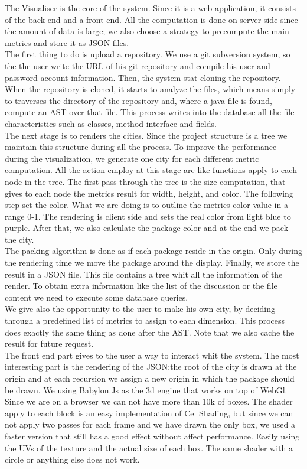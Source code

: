 \documentclass[]{usiinfbachelorproject}
\begin{document}
The Visualiser is the core of the system. Since it is a web application, it consists of the back-end and a front-end. All the computation is done on server side since the amount of data is large; we also choose a strategy to precompute the main metrics and store it as JSON files.\\
The first thing to do is upload a repository. We use a git subversion system, so the the user  write the URL of his git repository and compile his user and password account information. Then, the system stat cloning the repository. When the repository is cloned, it starts to analyze the files, which means simply to traverses the directory of the repository and, where a java file is found, compute an  AST over that file. This process writes into the database all the file characteristics such as classes, method interface and fields.\\
The next stage is to renders the cities. Since the project structure is a tree we maintain this structure during all the process. To improve the performance during the visualization, we generate one city for each different metric computation. All the action employ at this stage are like functions apply to each node in the tree. The first pass through the tree is the size computation, that gives to each node the metrics result for width, height, and color. The following step set the color. What we are doing is to outline the metrics color value in a range 0-1. The rendering is client side and sets the real color from light blue to purple. After that, we also calculate the package color and at the end we pack the city.\\
The packing algorithm is done as if each package reside in the origin. Only during the rendering time we move the package around the display. Finally, we store the result in a JSON file. This file contains a tree whit all the information of the render. To obtain extra information like the list of the discussion or the file content we need to execute some database queries.\\
We give also the opportunity to the user to make his own city, by deciding through a predefined list of metrics to assign to each dimension. This process does exactly the same thing as done after the AST. Note that we also cache the result for future request.\\ 
The front end part gives to the user a way to interact whit the system. The most interesting part is the rendering of the JSON:the root of the city is drawn at the origin and at each recursion we assign a new origin in which the package should be drawn. We using Babylon.Js as the 3d engine that works on top of WebGl. Since we are on a browser we can not have more than 10k of boxes. The shader apply to each block is an easy implementation of Cel Shading, but since we can not apply two passes for each frame and we have drawn the only box, we used a faster version that still has a good effect without affect performance. Easily using the UVs of the texture and the actual size of each box. The same shader with a circle or anything else  does not work.\\
\end{document}
